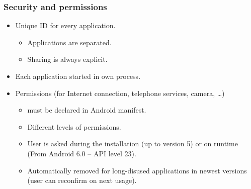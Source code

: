 \documentclass[10pt,xcolor=pdflatex]{beamer}
\begin{document}
\begin{frame}\frametitle{Security and permissions}
	\begin{itemize}
		\item Unique ID for every application.
          \begin{itemize}
        	\item Applications are separated.
        	\item Sharing is always explicit.
          \end{itemize}
        \item Each application started in own process.
		\item Permissions (for Internet connection, telephone services, camera, \ldots)
          \begin{itemize}
        	\item must be declared in Android manifest.
            \item Different levels of permissions.
            \item User is asked during the installation (up to version 5) or on runtime (From Android 6.0 -- API level 23).
            \item Automatically removed for long-disused applications in newest versions (user can reconfirm on next usage).
          \end{itemize}
	\end{itemize}
\end{frame}
\end{document}
